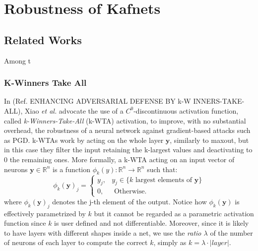 \documentclass[LaM,binding=0.6cm]{./packages/sapthesis/sapthesis}
\begin{document}
    
\part{Robustness of Kafnets}

    \chapter{Related Works}

    Among t
       
    \section{K-Winners Take All}
    In (Ref. ENHANCING ADVERSARIAL DEFENSE BY k-W INNERS-TAKE-ALL), Xiao \textit{et al.} advocate the use of a $C^0$-discontinuous activation function, called
    \textit{k-Winners-Take-All} (k-WTA) activation, to improve, with no substantial overhead, the robustness of a neural network against gradient-based attacks such as PGD.
    k-WTAs work by acting on the whole layer $\mathbf{y}$, similarly to maxout, but in this case they filter the input retaining the k-largest values and deactivating to 0 the remaining ones.
    More formally, a k-WTA acting on an input vector of neurons $\mathbf{y} \in \mathbb{R}^{n}$ is a function $\phi_k(y) : \mathbb{R}^n \to \mathbb{R}^n$ such that:
    \begin{equation}
        \phi_k(\mathbf{y})_j = \left\{\begin{array}{ll}
            y_{j}, & y_{j} \in\{k \text { largest elements of } \boldsymbol{y}\} \\
            0, & \text { Otherwise. }
            \end{array}\right. 
    \end{equation}
    where $\phi_k(\mathbf{y})_j$ denotes the j-th element of the output. Notice how $\phi_k(\mathbf{y})$ is effectively 
    parametrized by $k$ but it cannot be regarded as a parametric activation function since $k$ is user defined and not
    differentiable. Moreover, since it is likely to have layers with different shapes inside a net, we use the \textit{ratio $\lambda$}
    of the number of neurons of each layer to compute the correct $k$, simply as $k = \lambda \cdot |layer|$.
\end{document}
